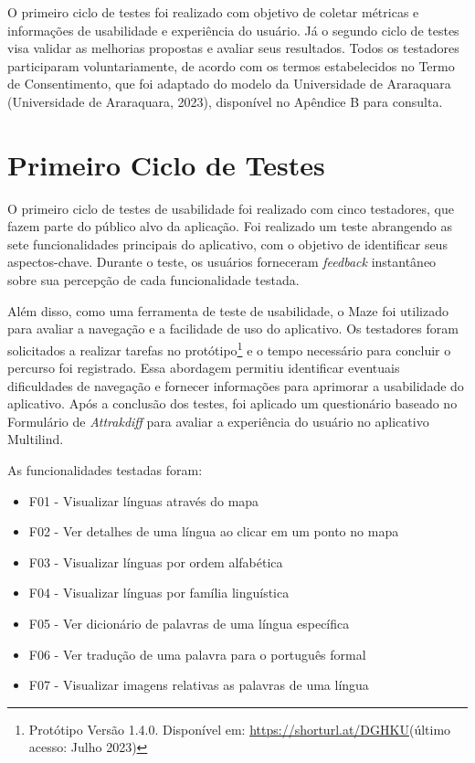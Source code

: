 O primeiro ciclo de testes foi realizado com objetivo de coletar métricas e informações de usabilidade e experiência do usuário. Já o segundo ciclo de testes visa validar as melhorias propostas e 
avaliar seus resultados. Todos os testadores participaram voluntariamente, de acordo com os termos estabelecidos no Termo de Consentimento, que foi adaptado do 
modelo da Universidade de Araraquara (Universidade de Araraquara, 2023), disponível no Apêndice B para consulta.
 
\section{Primeiro Ciclo de Testes}
\label{sec:Primeiro Ciclo}
O primeiro ciclo de testes de usabilidade foi realizado com cinco testadores, que fazem parte do público alvo da aplicação. Foi realizado um teste abrangendo as sete funcionalidades 
principais do aplicativo, com o objetivo de identificar seus aspectos-chave. Durante o teste, os usuários forneceram \textit{feedback} instantâneo sobre sua percepção de cada funcionalidade testada. 

Além disso, como uma ferramenta de teste de usabilidade, o Maze foi utilizado para avaliar a navegação e a facilidade de uso do aplicativo. Os testadores foram solicitados a realizar  
tarefas no protótipo\footnote{Protótipo Versão 1.4.0. Disponível em: \url{https://shorturl.at/DGHKU}(último acesso: Julho 2023)} 
e o tempo necessário para concluir o percurso foi registrado. Essa abordagem permitiu identificar eventuais dificuldades de navegação e fornecer informações para aprimorar a usabilidade do aplicativo. Após a conclusão dos 
testes, foi aplicado um questionário baseado no Formulário de \textit{Attrakdiff} para avaliar a experiência do usuário no aplicativo Multilind.

\begin{description}
    \item As funcionalidades testadas foram:
	\begin{itemize}
		\item F01 - Visualizar línguas através do mapa
		\item F02 - Ver detalhes de uma língua ao clicar em um ponto no mapa
		\item F03 - Visualizar línguas por ordem alfabética
		\item F04 - Visualizar línguas por família linguística
		\item F05 - Ver dicionário de palavras de uma língua específica
		\item F06 - Ver tradução de uma palavra para o português formal
		\item F07 - Visualizar imagens relativas as palavras de uma língua
	\end{itemize}
\end{description}

